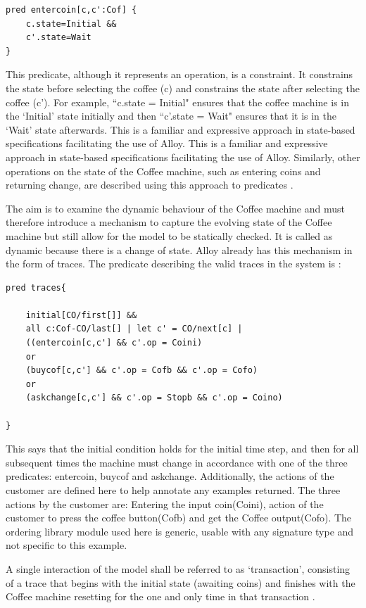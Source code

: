 \documentclass[a4paper,12pt]{report}
\begin{document}
\begin{verbatim}
pred entercoin[c,c':Cof] {
	c.state=Initial &&
	c'.state=Wait
}

\end{verbatim}

This predicate, although it represents an operation, is a constraint. It constrains the state before selecting the coffee (c) and constrains the state after selecting the coffee (c'). For example, ``c.state = Initial" ensures that the coffee machine is in the `Initial’ state initially and then ``c'.state = Wait" ensures that it is in the `Wait' state afterwards. This is a familiar and expressive approach in state-based specifications facilitating the use of Alloy. This is a familiar and expressive approach in state-based specifications facilitating the use of Alloy. Similarly, other operations on the state of the Coffee machine, such as entering coins and returning change, are described using this approach to predicates \cite{RussellBoyatt}.

The aim is to examine the dynamic behaviour of the Coffee machine and must therefore introduce a mechanism to capture the evolving state of the Coffee machine but still allow for the model to be statically checked. It is called as dynamic because there is a change of state. Alloy already has this mechanism in the form of traces. The predicate describing the valid traces in the system is \cite{RussellBoyatt}:

\begin{verbatim}
pred traces{

	initial[CO/first[]] &&
	all c:Cof-CO/last[] | let c' = CO/next[c] |
	((entercoin[c,c'] && c'.op = Coini)
	or
	(buycof[c,c'] && c'.op = Cofb && c'.op = Cofo)
	or
	(askchange[c,c'] && c'.op = Stopb && c'.op = Coino)

}
\end{verbatim}

This says that the initial condition holds for the initial time step, and then for all subsequent times the machine must change in accordance with one of the three predicates: entercoin, buycof and askchange. Additionally, the actions of the customer are defined here to help annotate any examples returned. The three actions by the customer are: Entering the input coin(Coini), action of the customer to press the coffee button(Cofb) and get the Coffee output(Cofo). The ordering library module used here is generic, usable with any signature type and not specific to this example.

A single interaction of the model shall be referred to as `transaction’, consisting of a trace that begins with the initial state (awaiting coins) and finishes with the Coffee machine resetting for the one and only time in that transaction \cite{RussellBoyatt}.
\end{document}
